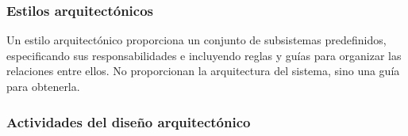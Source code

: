 \documentclass[12pt,spanish]{article}
\begin{document}
\subsubsection{Estilos arquitectónicos}

Un estilo arquitectónico proporciona un conjunto de subsistemas predefinidos, especificando sus responsabilidades e incluyendo reglas y guías para organizar las relaciones entre ellos. No proporcionan la arquitectura del sistema, sino una guía para obtenerla.



\subsubsection{Actividades del diseño arquitectónico}
\end{document}
